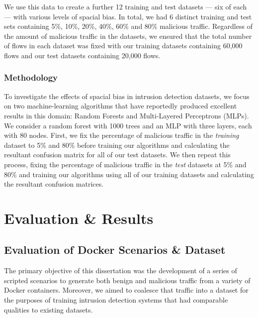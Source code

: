 \documentclass[msc,deptreport, cs]{infthesis} %
\begin{document}
We use this data to create a further 12 training and test datasets --- six of each --- with various levels of spacial bias. In total, we had 6 distinct training and test sets containing 5\%, 10\%, 20\%, 40\%, 60\% and 80\% malicious traffic. Regardless of the amount of malicious traffic in the datasets, we ensured that the total number of flows in each dataset was fixed with our training datasets containing 60,000 flows and our test datasets containing 20,000 flows.

\subsection{Methodology}

To investigate the effects of spacial bias in intrusion detection datasets, we focus on two machine-learning algorithms that have reportedly produced excellent results in this domain: Random Forests and Multi-Layered Perceptrons (MLPs). We consider a random forest with 1000 trees and an MLP with three layers, each with 80 nodes. First, we fix the percentage of malicious traffic in the \textit{training} dataset to 5\% and 80\% before training our algorithms and calculating the resultant confusion matrix for all of our test datasets. We then repeat this process, fixing the percentage of malicious traffic in the \textit{test} datasets at 5\% and 80\% and training our algorithms using all of our training datasets and calculating the resultant confusion matrices.



\chapter{Evaluation \& Results}
\label{sec:eval}

\section{Evaluation of Docker Scenarios \& Dataset}

The primary objective of this dissertation was the development of a series of scripted scenarios to generate both benign and malicious traffic from a variety of Docker containers. Moreover, we aimed to coalesce that traffic into a dataset for the purposes of training intrusion detection systems that had comparable qualities to existing datasets.
\end{document}
